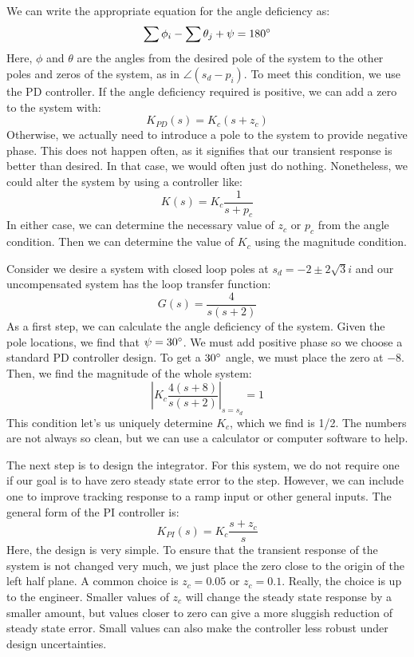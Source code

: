 We can write the appropriate equation for the angle deficiency as:
$$\sum\phi_i-\sum\theta_j+\psi=180\degree$$
Here, $\phi$ and $\theta$ are the angles from the desired pole of the system to the other poles and zeros of the system, as in $\angle(s_d-p_i)$. To meet this condition, we use the PD controller. If the angle deficiency required is positive, we can add a zero to the system with:
$$K_{PD}(s)=K_c(s+z_c)$$
Otherwise, we actually need to introduce a pole to the system to provide negative phase. This does not happen often, as it signifies that our transient response is better than desired. In that case, we would often just do nothing. Nonetheless,  we could alter the system by using a controller like:
$$K(s)=K_c\frac{1}{s+p_c}$$
In either case, we can determine the necessary value of $z_c$ or $p_c$ from the angle condition. Then we can determine the value of $K_c$ using the magnitude condition.

\begin{example}
Consider we desire a system with closed loop poles at $s_d=-2\pm2\sqrt{3}i$ and our uncompensated system has the loop transfer function:
$$G(s)=\frac{4}{s(s+2)}$$
As a first step, we can calculate the angle deficiency of the system. Given the pole locations, we find that $\psi=30\degree$. We must add positive phase so we choose a standard PD controller design. To get a $30\degree$ angle, we must place the zero at $-8$. Then, we find the magnitude of the whole system:
$$\left|K_c\frac{4(s+8)}{s(s+2)}\right|_{s=s_d}=1$$
This condition let's us uniquely determine $K_c$, which we find is 1/2. The numbers are not always so clean, but we can use a calculator or computer software to help.
\end{example}

The next step is to design the integrator. For this system, we do not require one if our goal is to have zero steady state error to the step. However, we can include one to improve tracking response to a ramp input or other general inputs. The general form of the PI controller is:
$$K_{PI}(s)=K_c\frac{s+z_c}{s}$$
Here, the design is very simple. To ensure that the transient response of the system is not changed very much, we just place the zero close to the origin of the left half plane. A common choice is $z_c=0.05$ or $z_c=0.1$. Really, the choice is up to the engineer. Smaller values of $z_c$ will change the steady state response by a smaller amount, but values closer to zero can give a more sluggish reduction of steady state error. Small values can also make the controller less robust under design uncertainties.

